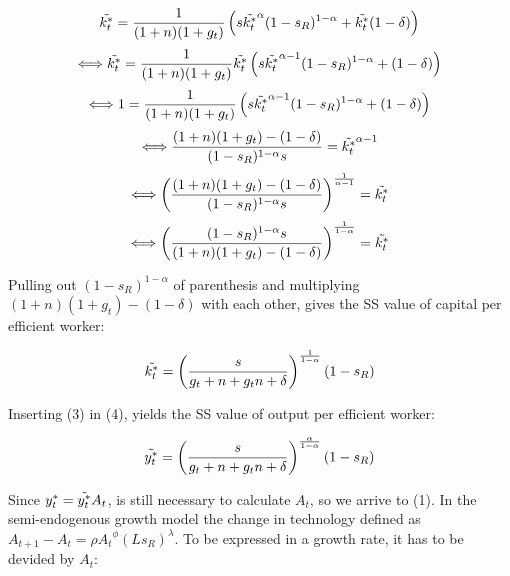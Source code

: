 \documentclass[11pt]{article} %
\begin{document}
\begin{align*}
    \Tilde{k_{t}^*}=\frac{1}{(1+n)(1+g_t)}\left(s\Tilde{k_{t}^*}^{\alpha}(1-s_R)^{1-\alpha}+\Tilde{k_{t}^*}(1-\delta)\right)
\end{align*}
\begin{align*}
    \Longleftrightarrow\Tilde{k_{t}^*}=\frac{1}{(1+n)(1+g_t)}\Tilde{k_{t}^*}\left(s\Tilde{k_{t}^*}^{\alpha-1}(1-s_R)^{1-\alpha}+(1-\delta)\right)
\end{align*}
\begin{align*}
    \Longleftrightarrow1=\frac{1}{(1+n)(1+g_t)}\left(s\Tilde{k_{t}^*}^{\alpha-1}(1-s_R)^{1-\alpha}+(1-\delta)\right)
\end{align*}
\begin{align*}
    \Longleftrightarrow \frac{(1+n)(1+g_t)-(1-\delta)}{(1-s_R)^{1-\alpha}s}=\Tilde{k_{t}^*}^{\alpha-1}
\end{align*}
\begin{align*}
    \Longleftrightarrow \left(\frac{(1+n)(1+g_t)-(1-\delta)}{(1-s_R)^{1-\alpha}s}\right)^{\frac{1}{\alpha-1}}=\Tilde{k_{t}^*}
\end{align*}
\begin{align*}
    \Longleftrightarrow \left(\frac{(1-s_R)^{1-\alpha}s}{(1+n)(1+g_t)-(1-\delta)}\right)^{\frac{1}{1-\alpha}}=\Tilde{k_{t}^*}
\end{align*}

\par Pulling out $(1-s_R)^{1-\alpha}$ of parenthesis and multiplying $(1+n)(1+g_t)-(1-\delta)$ with each other, gives the SS value of capital per efficient worker:

\begin{equation}
    \Tilde{k_{t}^*}=\left(\frac{s}{g_t+n+g_tn+\delta}\right)^{\frac{1}{1-\alpha}}(1-s_R)
\end{equation}

\bigskip\par Inserting (3) in (4), yields the SS value of output per efficient worker: 

\begin{equation}
    \Tilde{y_{t}^*}=\left(\frac{s}{g_t+n+g_tn+\delta}\right)^{\frac{\alpha}{1-\alpha}}(1-s_R)
\end{equation}

Since $y_t^*=\Tilde{y_t^*}A_t$, is still necessary to calculate $A_t$, so we arrive to (1). In the semi-endogenous growth model the change in technology defined as $A_{t+1}-A_t = {\rho}{A_t}^{\phi}(Ls_R)^{\lambda}$. To be expressed in a growth rate, it has to be devided by $A_t$:
\end{document}
